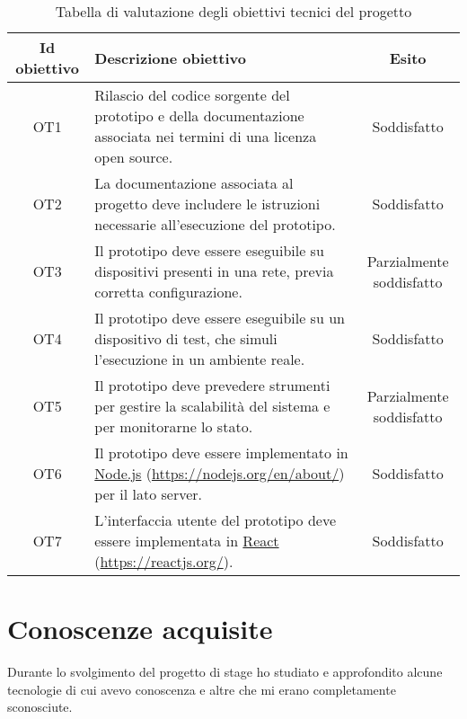 \begin{table}[H]
\caption{Tabella di valutazione degli obiettivi tecnici del progetto}
\label{tab:esito-obiettivi-tecnici}
\begin{tabularx}{\linewidth}{|c|X|c|}
\hline
\textbf{Id obiettivo} & \textbf{Descrizione obiettivo} & \textbf{Esito}\\
\hline
OT1 & Rilascio del codice sorgente del prototipo e della documentazione associata nei termini di una licenza \gls{open source}. & Soddisfatto \\
\hline
OT2 & La documentazione associata al progetto deve includere le istruzioni necessarie all'esecuzione del prototipo. & Soddisfatto \\
\hline
OT3 & Il prototipo deve essere eseguibile su dispositivi presenti in una rete, previa corretta configurazione. & Parzialmente soddisfatto \\
\hline
OT4 & Il prototipo deve essere eseguibile su un dispositivo di test, che simuli l'esecuzione in un ambiente reale. & Soddisfatto \\
\hline
OT5 & Il prototipo deve prevedere strumenti per gestire la scalabilità del sistema e per monitorarne lo stato. & Parzialmente soddisfatto \\
\hline
OT6 & Il prototipo deve essere implementato in \href{https://nodejs.org/en/about/}{Node.js} (\url{https://nodejs.org/en/about/}) per il lato server. & Soddisfatto \\
\hline
OT7 & L'interfaccia utente del prototipo deve essere implementata in \href{https://reactjs.org/}{React} (\url{https://reactjs.org/}). & Soddisfatto \\
\hline
\end{tabularx}
\end{table}


\section{Conoscenze acquisite}

Durante lo svolgimento del progetto di stage ho studiato e approfondito alcune tecnologie di cui avevo conoscenza e altre che mi erano completamente sconosciute.

